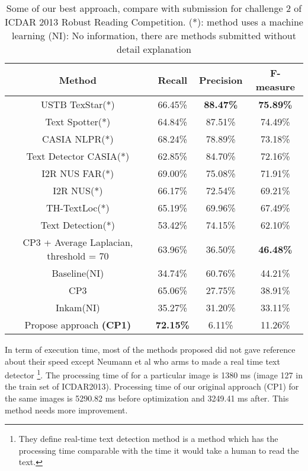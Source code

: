 \begin {table}[H]
\caption{Some of our best approach, compare with submission for challenge 2 of ICDAR 2013 Robust Reading Competition. (*): method uses a machine learning (NI): No information, there are methods submitted without detail explanation}\label{tab:Comparation} 
\begin{tabular}{|c|c|c|c|}
\hline 
\textbf{Method} & \textbf{Recall} & \textbf{Precision} & \textbf{F-measure} \\ 
\hline 
USTB TexStar(*) & 66.45\% & \textbf{88.47\%} & \textbf{75.89\%} \\ 
\hline 
Text Spotter(*) & 64.84\% & 87.51\% & 74.49\% \\ 
\hline 
CASIA NLPR(*)  & 68.24\% & 78.89\% & 73.18\% \\ 
\hline 
Text Detector CASIA(*) & 62.85\% & 84.70\% & 72.16\% \\ 
\hline 
I2R NUS FAR(*) & 69.00\% & 75.08\% & 71.91\% \\ 
\hline 
I2R NUS(*) & 66.17\% & 72.54\% & 69.21\% \\ 
\hline 
TH-TextLoc(*) & 65.19\% & 69.96\% & 67.49\% \\ 
\hline 
Text Detection(*) & 53.42\% & 74.15\% & 62.10\% \\ 
\hline 
CP3 + Average Laplacian, threshold = 70 & 63.96\% & 36.50\% & \textbf{46.48\%} \\ 
\hline 
Baseline(NI) & 34.74\% & 60.76\% & 44.21\%\\ 
\hline 
CP3 & 65.06\% & 27.75\% & 38.91\% \\ 
\hline 
Inkam(NI) & 35.27\% & 31.20\% & 33.11\% \\ 
\hline 
Propose approach \textbf{(CP1)} &\textbf{ \textbf{72.15\%}} & 6.11\% & 11.26\% \\
\hline 
\end{tabular} 
\end{table}

In term of execution time, most of the methods proposed did not gave reference about their speed except Neumann et al \cite{Neumann12} who arms to made a real time text detector \footnote{They define real-time text detection method is a method which has the processing time comparable with the time it would take a human to read the text.}. The processing time of \cite{Neumann12} for a particular image is 1380 ms (image 127 in the train set of ICDAR2013). Processing time of our original approach (CP1) for the same images is 5290.82 ms before optimization and 3249.41 ms after. This method needs more improvement.